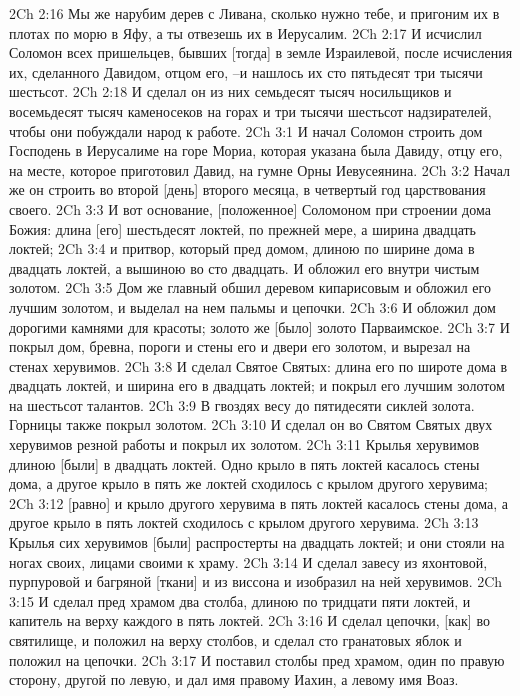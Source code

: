 2Ch 2:16  Мы же нарубим дерев с Ливана, сколько нужно тебе, и пригоним их в плотах по морю в Яфу, а ты отвезешь их в Иерусалим.
2Ch 2:17  И исчислил Соломон всех пришельцев, бывших [тогда] в земле Израилевой, после исчисления их, сделанного Давидом, отцом его, --и нашлось их сто пятьдесят три тысячи шестьсот.
2Ch 2:18  И сделал он из них семьдесят тысяч носильщиков и восемьдесят тысяч каменосеков на горах и три тысячи шестьсот надзирателей, чтобы они побуждали народ к работе.
2Ch 3:1  И начал Соломон строить дом Господень в Иерусалиме на горе Мориа, которая указана была Давиду, отцу его, на месте, которое приготовил Давид, на гумне Орны Иевусеянина.
2Ch 3:2  Начал же он строить во второй [день] второго месяца, в четвертый год царствования своего.
2Ch 3:3  И вот основание, [положенное] Соломоном при строении дома Божия: длина [его] шестьдесят локтей, по прежней мере, а ширина двадцать локтей;
2Ch 3:4  и притвор, который пред домом, длиною по ширине дома в двадцать локтей, а вышиною во сто двадцать. И обложил его внутри чистым золотом.
2Ch 3:5  Дом же главный обшил деревом кипарисовым и обложил его лучшим золотом, и выделал на нем пальмы и цепочки.
2Ch 3:6  И обложил дом дорогими камнями для красоты; золото же [было] золото Парваимское.
2Ch 3:7  И покрыл дом, бревна, пороги и стены его и двери его золотом, и вырезал на стенах херувимов.
2Ch 3:8  И сделал Святое Святых: длина его по широте дома в двадцать локтей, и ширина его в двадцать локтей; и покрыл его лучшим золотом на шестьсот талантов.
2Ch 3:9  В гвоздях весу до пятидесяти сиклей золота. Горницы также покрыл золотом.
2Ch 3:10  И сделал он во Святом Святых двух херувимов резной работы и покрыл их золотом.
2Ch 3:11  Крылья херувимов длиною [были] в двадцать локтей. Одно крыло в пять локтей касалось стены дома, а другое крыло в пять же локтей сходилось с крылом другого херувима;
2Ch 3:12  [равно] и крыло другого херувима в пять локтей касалось стены дома, а другое крыло в пять локтей сходилось с крылом другого херувима.
2Ch 3:13  Крылья сих херувимов [были] распростерты на двадцать локтей; и они стояли на ногах своих, лицами своими к храму.
2Ch 3:14  И сделал завесу из яхонтовой, пурпуровой и багряной [ткани] и из виссона и изобразил на ней херувимов.
2Ch 3:15  И сделал пред храмом два столба, длиною по тридцати пяти локтей, и капитель на верху каждого в пять локтей.
2Ch 3:16  И сделал цепочки, [как] во святилище, и положил на верху столбов, и сделал сто гранатовых яблок и положил на цепочки.
2Ch 3:17  И поставил столбы пред храмом, один по правую сторону, другой по левую, и дал имя правому Иахин, а левому имя Воаз.
